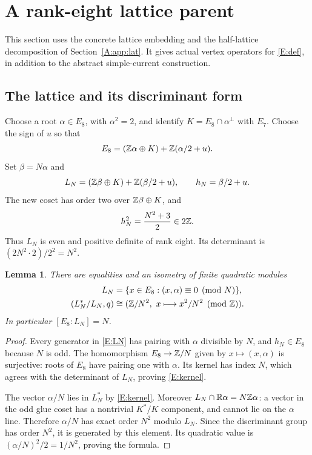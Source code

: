 \documentclass[11pt]{article}
\newtheorem{lemma}[theorem]{Lemma}
\numberwithin{equation}{section}
\newcommand{\R}{\mathbb R}
\begin{document}
\section{A rank-eight lattice parent}\label{E:lattice}
This section uses the concrete lattice embedding and the half-lattice decomposition of Section~\ref{A:app:lat}. It gives actual vertex operators for \eqref{E:def}, in addition to the abstract simple-current construction.

\subsection{The lattice and its discriminant form}
Choose a root $\alpha\in E_8$, with $\alpha^2=2$, and identify $K=E_8\cap\alpha^\perp$ with $E_7$. Choose the sign of $u$ so that
\[
E_8=(\mathbb Z\alpha\oplus K)+\mathbb Z(\alpha/2+u).
\]
Set $\beta=N\alpha$ and
\begin{equation}\label{E:LN}
L_N=(\mathbb Z\beta\oplus K)+\mathbb Z(\beta/2+u),\qquad h_N=\beta/2+u.
\end{equation}
The new coset has order two over $\mathbb Z\beta\oplus K$, and
\[
h_N^2=\frac{N^2+3}{2}\in2\mathbb Z.
\]
Thus $L_N$ is even and positive definite of rank eight. Its determinant is $(2N^2\cdot2)/2^2=N^2$.

\begin{lemma}\label{E:discriminant}
There are equalities and an isometry of finite quadratic modules
\begin{align}
L_N&=\{x\in E_8:(x,\alpha)\equiv0\pmod N\},\label{E:kernel}\\
(L_N^*/L_N,q)&\cong(\mathbb Z/N^2,\ x\longmapsto x^2/N^2\pmod{\mathbb Z}).\label{E:discriminantform}
\end{align}
In particular $[E_8:L_N]=N$.
\end{lemma}
\begin{proof}
Every generator in \eqref{E:LN} has pairing with $\alpha$ divisible by $N$, and $h_N\in E_8$ because $N$ is odd. The homomorphism $E_8\to\mathbb Z/N$ given by $x\mapsto(x,\alpha)$ is surjective: roots of $E_8$ have pairing one with $\alpha$. Its kernel has index $N$, which agrees with the determinant of $L_N$, proving \eqref{E:kernel}.

The vector $\alpha/N$ lies in $L_N^*$ by \eqref{E:kernel}. Moreover $L_N\cap\R\alpha=N\Z\alpha$: a vector in the odd glue coset has a nontrivial $K^*/K$ component, and cannot lie on the $\alpha$ line. Therefore $\alpha/N$ has exact order $N^2$ modulo $L_N$. Since the discriminant group has order $N^2$, it is generated by this element. Its quadratic value is $(\alpha/N)^2/2=1/N^2$, proving the formula.
\end{proof}
\end{document}
